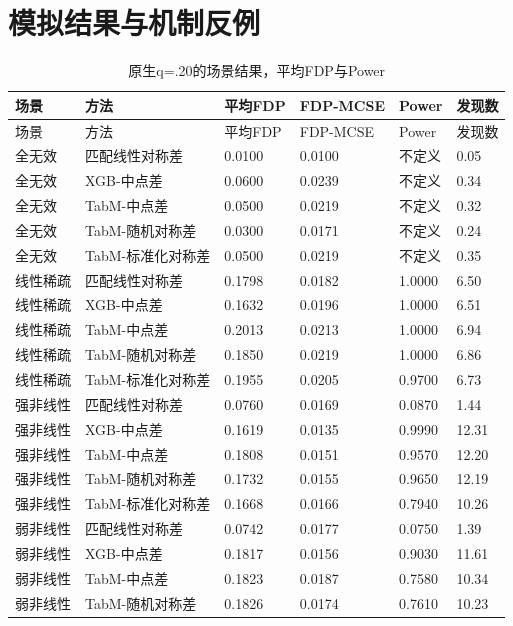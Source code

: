 \documentclass{sufethesismas}
\begin{document}
\section{模拟结果与机制反例}

{
\footnotesize
\begin{longtable}[]{@{}llllll@{}}
\caption{原生q=.20的场景结果，平均FDP与Power}\tabularnewline
\toprule\noalign{}
场景 & 方法 & 平均FDP & FDP-MCSE & Power & 发现数 \\
\midrule\noalign{}
\endfirsthead
\toprule\noalign{}
场景 & 方法 & 平均FDP & FDP-MCSE & Power & 发现数 \\
\midrule\noalign{}
\endhead
\bottomrule\noalign{}
\endlastfoot
全无效 & 匹配线性对称差 & 0.0100 & 0.0100 & 不定义 & 0.05 \\
全无效 & XGB-中点差 & 0.0600 & 0.0239 & 不定义 & 0.34 \\
全无效 & TabM-中点差 & 0.0500 & 0.0219 & 不定义 & 0.32 \\
全无效 & TabM-随机对称差 & 0.0300 & 0.0171 & 不定义 & 0.24 \\
全无效 & TabM-标准化对称差 & 0.0500 & 0.0219 & 不定义 & 0.35 \\
线性稀疏 & 匹配线性对称差 & 0.1798 & 0.0182 & 1.0000 & 6.50 \\
线性稀疏 & XGB-中点差 & 0.1632 & 0.0196 & 1.0000 & 6.51 \\
线性稀疏 & TabM-中点差 & 0.2013 & 0.0213 & 1.0000 & 6.94 \\
线性稀疏 & TabM-随机对称差 & 0.1850 & 0.0219 & 1.0000 & 6.86 \\
线性稀疏 & TabM-标准化对称差 & 0.1955 & 0.0205 & 0.9700 & 6.73 \\
强非线性 & 匹配线性对称差 & 0.0760 & 0.0169 & 0.0870 & 1.44 \\
强非线性 & XGB-中点差 & 0.1619 & 0.0135 & 0.9990 & 12.31 \\
强非线性 & TabM-中点差 & 0.1808 & 0.0151 & 0.9570 & 12.20 \\
强非线性 & TabM-随机对称差 & 0.1732 & 0.0155 & 0.9650 & 12.19 \\
强非线性 & TabM-标准化对称差 & 0.1668 & 0.0166 & 0.7940 & 10.26 \\
弱非线性 & 匹配线性对称差 & 0.0742 & 0.0177 & 0.0750 & 1.39 \\
弱非线性 & XGB-中点差 & 0.1817 & 0.0156 & 0.9030 & 11.61 \\
弱非线性 & TabM-中点差 & 0.1823 & 0.0187 & 0.7580 & 10.34 \\
弱非线性 & TabM-随机对称差 & 0.1826 & 0.0174 & 0.7610 & 10.23 \\

\end{longtable}}
\end{document}

